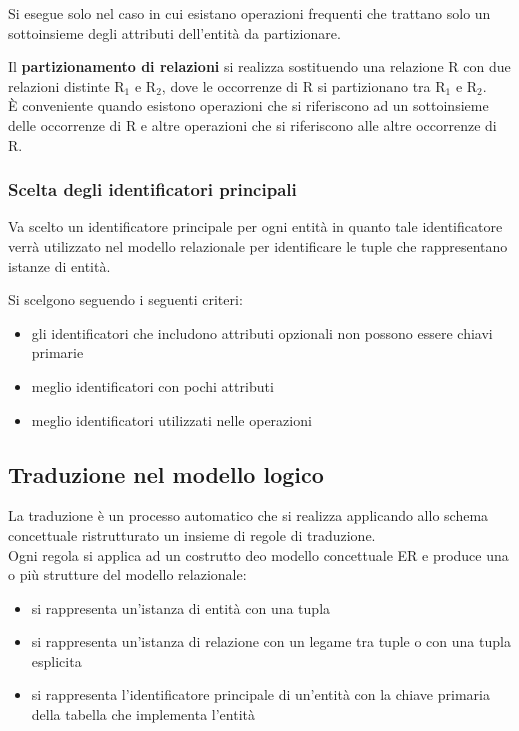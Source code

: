 \documentclass[12pt, a4paper, oneside]{book}
\begin{document}
    Si esegue solo nel caso in cui esistano operazioni frequenti che trattano solo un sottoinsieme degli attributi dell’entità da partizionare.

    \medskip
    Il \textcolor{azzurrino}{\textbf{partizionamento di relazioni}} si realizza sostituendo una relazione R con due relazioni distinte $\mathrm{R_1}$ e $\mathrm{R_2}$, dove le occorrenze di R si partizionano tra $\mathrm{R_1}$ e $\mathrm{R_2}$.\\[0.2ex] 
    È conveniente quando esistono operazioni che si riferiscono ad un sottoinsieme delle occorrenze di R e altre operazioni che si riferiscono alle altre occorrenze di R.

    \subsubsection{Scelta degli identificatori principali}{
      Va scelto un identificatore principale per ogni entità in quanto tale identificatore verrà utilizzato nel modello relazionale per identificare le tuple che rappresentano istanze di entità.
      
      Si scelgono seguendo i seguenti criteri:
      \begin{itemize}[label=$\triangleright$]
        \item gli identificatori che includono attributi opzionali non possono essere chiavi primarie
        \smallskip
        \item meglio identificatori con pochi attributi
        \smallskip
        \item meglio identificatori utilizzati nelle operazioni
      \end{itemize}
    }

    \subsection{Traduzione nel modello logico}
    La traduzione è un processo automatico che si realizza applicando allo schema concettuale ristrutturato un insieme di regole di traduzione.\\[0.2ex]
    Ogni regola si applica ad un costrutto deo modello concettuale ER e produce una o più strutture del modello relazionale:
    \begin{itemize}
      \item si rappresenta un’istanza di entità con una tupla
      \smallskip
      \item  si rappresenta un’istanza di relazione con un legame tra tuple o con una tupla esplicita
      \smallskip
      \item si rappresenta l’identificatore principale di un’entità con la chiave primaria della tabella che implementa l’entità
    \end{itemize}
\end{document}
